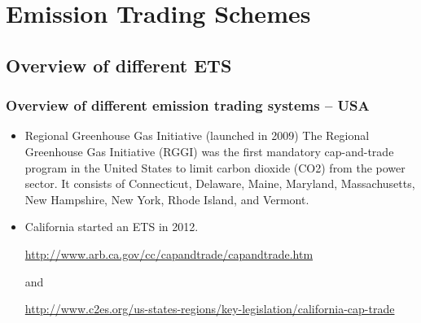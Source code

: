 \section{Emission Trading Schemes}


\subsection[Overview]{Overview of different ETS}
\begin{frame}
  \frametitle{Overview of different emission trading systems  -- USA}
  \begin{itemize}
  \item<1-> 
  Regional Greenhouse Gas Initiative (launched in 2009)
        The Regional Greenhouse Gas Initiative (RGGI) was the first mandatory cap-and-trade program in the United States to limit carbon dioxide (CO2) from the power sector. It consists of Connecticut, Delaware, Maine, Maryland, Massachusetts, New Hampshire, New York, Rhode Island, and Vermont.
\item<2-> 
   California started an ETS in 2012. 
   
   \url{http://www.arb.ca.gov/cc/capandtrade/capandtrade.htm} 
   
  and  
  
  \url{http://www.c2es.org/us-states-regions/key-legislation/california-cap-trade}        
\end{itemize}      
\end{frame}
          
